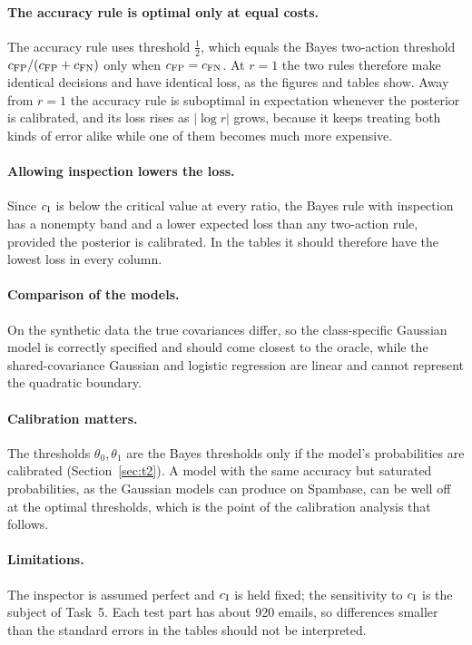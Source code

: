\paragraph{The accuracy rule is optimal only at equal costs.}
The accuracy rule uses threshold $\tfrac12$, which equals the Bayes two-action threshold
$c_{\mathrm{FP}}/(c_{\mathrm{FP}}+c_{\mathrm{FN}})$ only when $c_{\mathrm{FP}}=c_{\mathrm{FN}}$. At $r=1$ the two rules therefore make identical decisions and
have identical loss, as the figures and tables show. Away from $r=1$ the accuracy rule is
suboptimal in expectation whenever the posterior is calibrated, and its loss rises as $|\log r|$ grows,
because it keeps treating both kinds of error alike while one of them becomes much more expensive.

\paragraph{Allowing inspection lowers the loss.}
Since $c_{\mathrm{I}}$ is below the critical value at every ratio, the Bayes rule with inspection has a nonempty band and
a lower expected loss than any two-action rule, provided the posterior is calibrated. In the tables it should
therefore have the lowest loss in every column.

\paragraph{Comparison of the models.}
On the synthetic data the true covariances differ, so the class-specific Gaussian model is correctly specified
and should come closest to the oracle, while the shared-covariance Gaussian and logistic regression are
linear and cannot represent the quadratic boundary.

\paragraph{Calibration matters.}
The thresholds $\theta_0,\theta_1$ are the Bayes thresholds only if the model's probabilities are calibrated
(Section~\ref{sec:t2}). A model with the same accuracy but saturated probabilities, as the Gaussian models can
produce on Spambase, can be well off at the optimal thresholds, which is the point of the calibration analysis
that follows. 

\paragraph{Limitations.}
The inspector is assumed perfect and $c_{\mathrm{I}}$ is held fixed; the sensitivity to $c_{\mathrm{I}}$ is the subject of
Task~5. Each test part has about 920 emails, so differences smaller than the standard errors in the tables
should not be interpreted.

